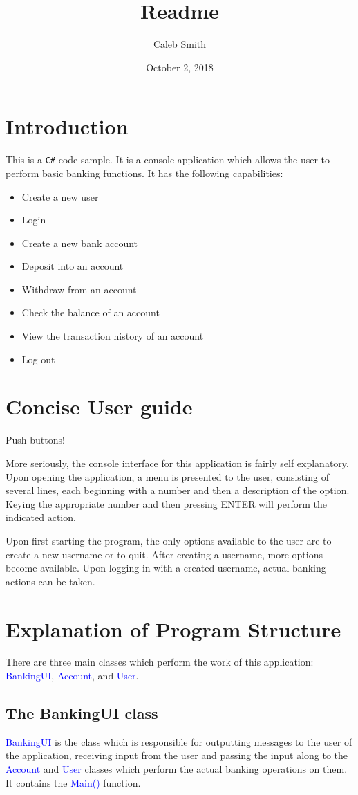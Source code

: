 \documentclass[12pt, notitlepage] {amsart}
\newcommand{\aq}[1] {\textcolor{blue}{#1}}
\begin{document}
\title{Readme}
\date{October 2, 2018}
\author{Caleb Smith}
\maketitle

\section{Introduction}
This is a \texttt{C\#} code sample. It is a console
application which allows the user to perform basic banking
functions. It has the following capabilities:
\begin{itemize} 
\item Create a new user 
\item Login 
\item Create a new bank account 
\item Deposit into an account 
\item Withdraw from an account 
\item Check the balance of an account 
\item View the transaction history of an account 
\item Log out
\end{itemize}

\section{Concise User guide}
Push buttons!

More seriously, the console interface for this application is fairly self
explanatory. Upon opening the application, a menu is presented to the user,
consisting of several lines, each beginning with a number and then a
description of the option. Keying the appropriate number and then
pressing ENTER will perform the indicated action.

Upon first starting the program, the only options available to the
user are to create a new username or to quit. After creating a
username, more options become available. Upon logging in with a
created username, actual banking actions can be taken.


\section{Explanation of Program Structure}
There are three main classes which perform the work of this application: 
\aq{BankingUI}, \aq{Account}, and \aq{User}. 

\subsection{The BankingUI class}
\aq{BankingUI} is the class which is responsible for outputting messages to the user of the application, receiving input from the user and passing the input along to the \aq{Account} and \aq{User} classes which perform the actual banking operations on them. It contains the \aq{Main()} function.
\end{document}
